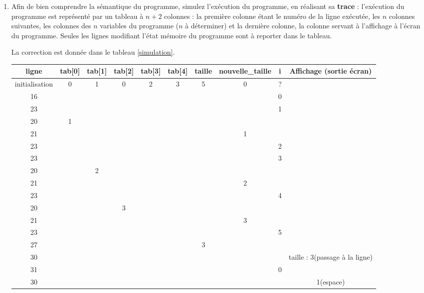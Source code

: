 \begin{enumerate}
\item Afin de bien comprendre la sémantique du programme, simulez
  l'exécution du programme, en réalisant sa \textbf{trace} : l'exécution
  du programme est représenté par un tableau à $n + 2$ colonnes : la
  première colonne étant le numéro de la ligne exécutée, les $n$
  colonnes suivantes, les colonnes des $n$ variables du programme ($n$ à
  déterminer) et la dernière colonne, la colonne servant à
  l'affichage à l'écran du programme. Seules les lignes modifiant l'état mémoire du programme sont à reporter dans le tableau.
  \begin{correction}
    La correction est donnée dans le tableau \ref{simulation}.
    \begin{table}[h]
      \begin{tiny}
	\begin{center}
		\begin{tabular}[h]{|c|c|c|c|c|c|c|c|c|c|}
                  \hline
			ligne & tab[0] & tab[1] & tab[2] & tab[3] & tab[4]& taille & nouvelle\_taille & i & Affichage (sortie écran) \\ 
		\hline
           initialisation  &0 &1 &0 &2 &3 &5 &0 &? &  \\ \hline
			16 &  &  &  &  &  &  &  &0 &  \\ \hline
                        23 &  &  &  &  &  &  &  &1 &  \\ \hline
			20 &1 &  &  &  &  &  &  &  &  \\ \hline
			21 &  &  &  &  &  &  &1 &  &  \\ \hline
			23 &  &  &  &  &  &  &  &2 &  \\ \hline
			23 &  &  &  &  &  &  &  &3 &  \\ \hline
			20 &  &2 &  &  &  &  &  &  &  \\ \hline
			21 &  &  &  &  &  &  &2 &  &  \\ \hline
			23 &  &  &  &  &  &  &  &4 &  \\ \hline
			20 &  &  &3 &  &  &  &  &  &  \\ \hline
			21 &  &  &  &  &  &  &3 &  &  \\ \hline
			23 &  &  &  &  &  &  &  &5 &  \\ \hline
			27 &  &  &  &  &  &3 &  &  &  \\ \hline
			30 &  &  &  &  &  &  &  &  & taille : 3(passage à la ligne) \\ \hline
			31 &  &  &  &  &  &  &  &0 &  \\ \hline
			30 &  &  &  &  &  &  &  &  & 1(espace) \\ \hline

\end{tabular}
\end{center}
\end{tiny}
\end{table}
\end{correction}
\end{enumerate}
